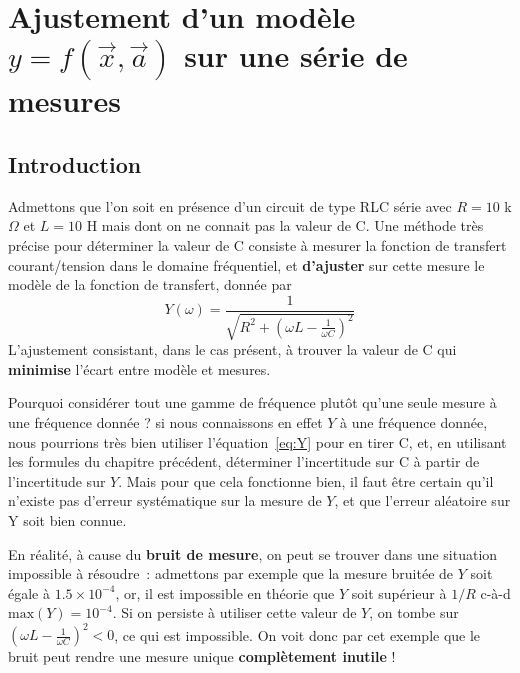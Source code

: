 
\chapter{Ajustement d'un modèle $y=f(\vec{x},\vec{a})$ sur une série de mesures}

\section{Introduction}

Admettons que l'on soit en présence d'un circuit de type RLC série avec $R=10$ k$\Omega$ et $L=10$ H mais dont on ne connait pas la valeur de C. Une méthode très précise pour déterminer la valeur de C consiste à mesurer la fonction de transfert courant/tension dans le domaine fréquentiel, et \textbf{d'ajuster} sur cette mesure le modèle de la fonction de transfert, donnée par
\begin{equation}
Y(\omega)=\frac{1}{\sqrt{R^2+\left(\omega L-\frac{1}{\omega C}\right)^2}}
\label{eq:Y}
\end{equation}
L'ajustement consistant, dans le cas présent, à trouver la valeur de C qui \textbf{minimise} l'écart entre modèle et mesures.

Pourquoi considérer tout une gamme de fréquence plutôt qu'une seule mesure à une fréquence donnée ? si nous connaissons en effet $Y$ à une fréquence donnée, nous pourrions très bien utiliser l'équation~\ref{eq:Y} pour en tirer C, et, en utilisant les formules du chapitre précédent, déterminer l'incertitude sur C à partir de l'incertitude sur $Y$. Mais pour que cela fonctionne bien, il faut être certain qu'il n'existe pas d'erreur systématique sur la mesure de $Y$, et que l'erreur aléatoire sur Y soit bien connue.

En réalité, à cause du \textbf{bruit de mesure}, on peut se trouver dans une situation impossible à résoudre~: admettons par exemple que la mesure bruitée de $Y$ soit égale à $1.5\times10^{-4}$, or, il est impossible en théorie que $Y$ soit supérieur à $1/R$ c-à-d $\text{max}(Y)=10^{-4}$. Si on persiste à utiliser cette valeur de $Y$, on tombe sur $\left(\omega L-\frac{1}{\omega C}\right)^2<0$, ce qui est impossible. On voit donc par cet exemple que le bruit peut rendre une mesure unique \textbf{complètement inutile} !

